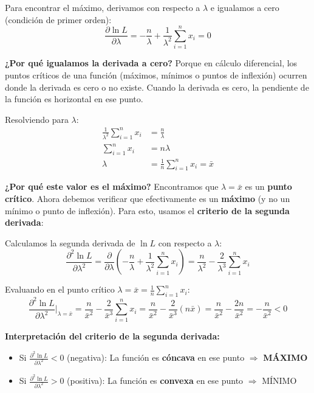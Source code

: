 \documentclass[
  11pt,
  letterpaper,
   addpoints,
   answers
  ]{exam}
\begin{document}
\begin{questions}
\begin{parts}
\begin{solution}
Para encontrar el máximo, derivamos con respecto a $\lambda$ e igualamos a cero (condición de primer orden):
\begin{equation}
\frac{\partial \ln L}{\partial \lambda} = -\frac{n}{\lambda} + \frac{1}{\lambda^2}\sum_{i=1}^{n} x_i = 0
\end{equation}

\textbf{¿Por qué igualamos la derivada a cero?} Porque en cálculo diferencial, los puntos críticos de una función (máximos, mínimos o puntos de inflexión) ocurren donde la derivada es cero o no existe. Cuando la derivada es cero, la pendiente de la función es horizontal en ese punto.

Resolviendo para $\lambda$:
\begin{align}
\frac{1}{\lambda^2}\sum_{i=1}^{n} x_i &= \frac{n}{\lambda}\\
\sum_{i=1}^{n} x_i &= n\lambda\\
\lambda &= \frac{1}{n}\sum_{i=1}^{n} x_i = \bar{x}
\end{align}

\textbf{¿Por qué este valor es el máximo?} Encontramos que $\lambda = \bar{x}$ es un \textbf{punto crítico}. Ahora debemos verificar que efectivamente es un \textbf{máximo} (y no un mínimo o punto de inflexión). Para esto, usamos el \textbf{criterio de la segunda derivada}:

Calculamos la segunda derivada de $\ln L$ con respecto a $\lambda$:
\begin{equation}
\frac{\partial^2 \ln L}{\partial \lambda^2} = \frac{\partial}{\partial \lambda}\left(-\frac{n}{\lambda} + \frac{1}{\lambda^2}\sum_{i=1}^{n} x_i\right) = \frac{n}{\lambda^2} - \frac{2}{\lambda^3}\sum_{i=1}^{n} x_i
\end{equation}

Evaluando en el punto crítico $\lambda = \bar{x} = \frac{1}{n}\sum_{i=1}^{n} x_i$:
\begin{equation}
\frac{\partial^2 \ln L}{\partial \lambda^2}\bigg|_{\lambda=\bar{x}} = \frac{n}{\bar{x}^2} - \frac{2}{\bar{x}^3}\sum_{i=1}^{n} x_i = \frac{n}{\bar{x}^2} - \frac{2}{\bar{x}^3}(n\bar{x}) = \frac{n}{\bar{x}^2} - \frac{2n}{\bar{x}^2} = -\frac{n}{\bar{x}^2} < 0
\end{equation}

\textbf{Interpretación del criterio de la segunda derivada:}
\begin{itemize}
\item Si $\frac{\partial^2 \ln L}{\partial \lambda^2} < 0$ (negativa): La función es \textbf{cóncava} en ese punto $\Rightarrow$ \textbf{MÁXIMO}
\item Si $\frac{\partial^2 \ln L}{\partial \lambda^2} > 0$ (positiva): La función es \textbf{convexa} en ese punto $\Rightarrow$ MÍNIMO
\end{itemize}


\end{solution}
\end{parts}
\end{questions}
\end{document}
